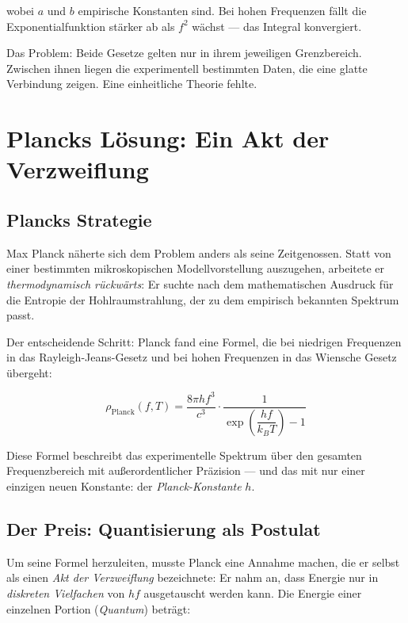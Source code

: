 wobei $a$ und $b$ empirische Konstanten sind. Bei hohen Frequenzen fällt die 
Exponentialfunktion stärker ab als $f^2$ wächst — das Integral konvergiert.

Das Problem: Beide Gesetze gelten nur in ihrem jeweiligen Grenzbereich. Zwischen ihnen 
liegen die experimentell bestimmten Daten, die eine glatte Verbindung zeigen. Eine 
einheitliche Theorie fehlte.

\clearpage

\section{Plancks Lösung: Ein Akt der Verzweiflung}
\label{sec:planck}

\subsection{Plancks Strategie}

Max Planck näherte sich dem Problem anders als seine Zeitgenossen. Statt von einer 
bestimmten mikroskopischen Modellvorstellung auszugehen, arbeitete er 
\emph{thermodynamisch rückwärts}: Er suchte nach dem mathematischen Ausdruck für 
die Entropie der Hohlraumstrahlung, der zu dem empirisch bekannten Spektrum passt.

Der entscheidende Schritt: Planck fand eine Formel, die bei niedrigen Frequenzen 
in das Rayleigh-Jeans-Gesetz und bei hohen Frequenzen in das Wiensche Gesetz übergeht:

\begin{equation}
    \rho_{\text{Planck}}(f, T) = \frac{8\pi h f^3}{c^3} \cdot \frac{1}{\exp\!\left(\dfrac{hf}{k_BT}\right) - 1}
    \label{eq:planck_law}
\end{equation}

Diese Formel beschreibt das experimentelle Spektrum über den gesamten Frequenzbereich 
mit außerordentlicher Präzision — und das mit nur einer einzigen neuen Konstante: 
der \emph{Planck-Konstante} $h$.

\subsection{Der Preis: Quantisierung als Postulat}

Um seine Formel herzuleiten, musste Planck eine Annahme machen, die er selbst als 
einen \emph{Akt der Verzweiflung} bezeichnete: Er nahm an, dass Energie nur in 
\emph{diskreten Vielfachen} von $hf$ ausgetauscht werden kann. Die Energie einer 
einzelnen Portion (\emph{Quantum}) beträgt:

